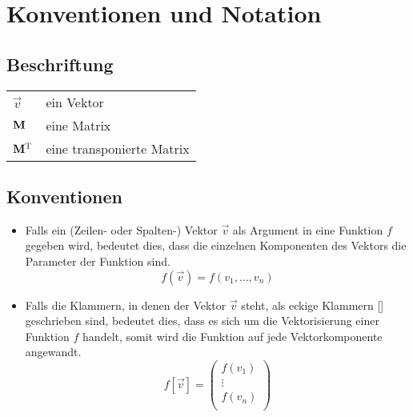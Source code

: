 \documentclass[../main]{subfiles}
\begin{document}
\newcommand{\refsec}[1]{
  \begin{tikzpicture}
  \node[rounded corners,fill=red] (0,0) {#1};
\end{tikzpicture}
}




\section{Konventionen und Notation}

\subsection*{Beschriftung}

\begin{tabular}{ll}
  $\vec{v}$ & ein Vektor \refsec{Test} \\
  $\mathbf{M}$ & eine Matrix \\
  $\mathbf{M}^\mathrm{T}$ & eine transponierte Matrix \\

\end{tabular}


\subsection*{Konventionen}

\begin{itemize}

\item{
    Falls ein (Zeilen- oder Spalten-) Vektor $\vec{v}$ als Argument in eine
    Funktion $f$ gegeben wird, bedeutet dies,
    dass die einzelnen Komponenten des Vektors die Parameter der Funktion sind.
    \begin{equation*}
      f(\vec{v})=f(v_1,\ldots,v_n)
    \end{equation*}
  }

\item{
    Falls die Klammern, in denen der Vektor $\vec{v}$ steht, als eckige
    Klammern [] geschrieben sind, bedeutet dies, dass es sich um die
    Vektorisierung einer Funktion $f$ handelt, somit wird die Funktion auf
    jede Vektorkomponente angewandt.
    \begin{equation*}
      f[\vec{v}]=
      \begin{pmatrix}
        f(v_1)\\
        \vdots \\
        f(v_n)\\
      \end{pmatrix}
    \end{equation*}
  }

\end{itemize}
\end{document}
